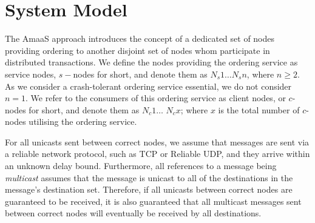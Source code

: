 %		

\section{System Model}	
	The \textsf{AmaaS} approach introduces the concept of a dedicated set of nodes providing ordering to another disjoint set of nodes whom participate in distributed transactions.  We define the nodes providing the ordering service as service nodes, $s-$nodes for short, and denote them as $N_s1 \ldots N_sn$, where $n \geq 2$.  As we consider a crash-tolerant ordering service essential, we do not consider $n = 1$.  We refer to the consumers of this ordering service as client nodes, or $c$-nodes for short, and denote them as $N_c1 \ldots$ $N_cx$; where $x$ is the total number of $c$-nodes utilising the ordering service.  
		
    For all unicasts sent between correct nodes, we assume that messages are sent via a reliable network protocol, such as TCP\citep{Cerf:2005:PPN:1064413.1064423} or Reliable UDP\citep{ReliableUDP}, and they arrive within an unknown delay bound.   Furthermore, all references to a message being \emph{multicast} assumes that the message is unicast to all of the destinations in the message's destination set.  Therefore, if all unicasts between correct nodes are guaranteed to be received, it is also guaranteed that all multicast messages sent between correct nodes will eventually be received by all destinations.  
		
